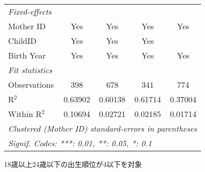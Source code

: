 \documentclass{article}
\begin{document}
\begin{landscape}
\begin{threeparttable}[b]
\begin{tabular}{lcccc}
      \midrule
      \emph{Fixed-effects}\\
      Mother ID                                     & Yes            & Yes           & Yes     & Yes\\  
      ChildID                                       & Yes            & Yes           & Yes     & \\  
      Birth Year                                    & Yes            & Yes           & Yes     & Yes\\  
      \midrule
      \emph{Fit statistics}\\
      Observations                                  & 398            & 678           & 341     & 774\\  
      R$^2$                                         & 0.63902        & 0.60138       & 0.61714 & 0.37004\\  
      Within R$^2$                                  & 0.10694        & 0.02721       & 0.02185 & 0.01714\\  
      \midrule \midrule
      \multicolumn{5}{l}{\emph{Clustered (Mother ID) standard-errors in parentheses}}\\
      \multicolumn{5}{l}{\emph{Signif. Codes: ***: 0.01, **: 0.05, *: 0.1}}\\
   \end{tabular}
   
   \begin{tablenotes}\item 18歳以上24歳以下の出生順位が4以下を対象
   \end{tablenotes}
\end{threeparttable}
\par\endgroup


\end{landscape}
\end{document}
